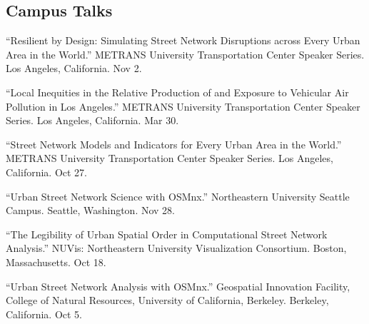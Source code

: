     
    \subsection*{Campus Talks}

    \begin{tablist}


        \item[2023] \tab{}\enquote{Resilient by Design: Simulating Street Network Disruptions across Every Urban Area in the World.} METRANS University Transportation Center Speaker Series. Los Angeles, California. Nov 2.

        \item[2022] \tab{}\enquote{Local Inequities in the Relative Production of and Exposure to Vehicular Air Pollution in Los Angeles.} METRANS University Transportation Center Speaker Series. Los Angeles, California. Mar 30.

        \item[2020] \tab{}\enquote{Street Network Models and Indicators for Every Urban Area in the World.} METRANS University Transportation Center Speaker Series. Los Angeles, California. Oct 27.

        \item[2018] \tab{}\enquote{Urban Street Network Science with OSMnx.} Northeastern University Seattle Campus. Seattle, Washington. Nov 28.

        \item[2018] \tab{}\enquote{The Legibility of Urban Spatial Order in Computational Street Network Analysis.} NUVis: Northeastern University Visualization Consortium. Boston, Massachusetts. Oct 18.

        \item[2017] \tab{}\enquote{Urban Street Network Analysis with OSMnx.} Geospatial Innovation Facility, College of Natural Resources, University of California, Berkeley. Berkeley, California. Oct 5.

    \end{tablist}